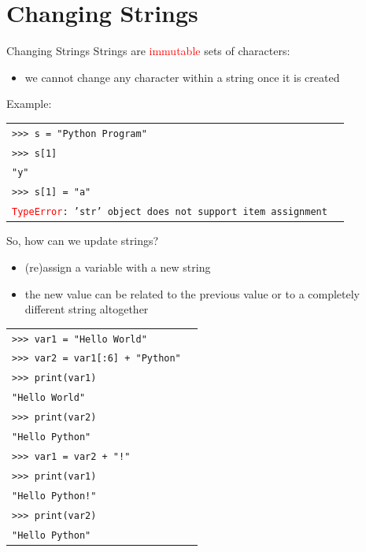 \documentclass[t,handout,9pt]{beamer}
\begin{document}
\section{Changing Strings}
\begin{frame}{Changing Strings}
\vfill
Strings are \textcolor{red}{immutable} sets of characters:
\begin{itemize}
	\item we cannot change any character within a string once it is created
\end{itemize}
\vfill
Example:
\begin{table}[]
\begin{flushleft}
\begin{tabular}{ll}
\texttt{>{}>{}> s = "Python Program"} &  \\
\texttt{>{}>{}> s[1]} &  \\
\texttt{"y"} &  \\
\texttt{>{}>{}> s[1] = "a"} &  \\
\texttt{\textcolor{red}{TypeError}: 'str' object does not support item assignment} &  \\
\end{tabular}
\end{flushleft}
\end{table}
\vfill
\end{frame}
%
\begin{frame}
\vfill
So, how can we update strings?
\begin{itemize}
	\item (re)assign a variable with a new string
	\item the new value can be related to the previous value or to a completely different string altogether
\end{itemize}
\vfill
\begin{table}[]
\begin{flushleft}
\begin{tabular}{ll}
\texttt{>{}>{}> var1 = "Hello World"} &  \\
\texttt{>{}>{}> var2 = var1[:6] + "Python"} &  \\
\texttt{>{}>{}> print(var1)} &  \\
\texttt{"Hello World"} &  \\
\texttt{>{}>{}> print(var2)} &  \\
\texttt{"Hello Python"} &  \\
\texttt{>{}>{}> var1 = var2 + "!"} &  \\
\texttt{>{}>{}> print(var1)} &  \\
\texttt{"Hello Python!"} &  \\
\texttt{>{}>{}> print(var2)} &  \\
\texttt{"Hello Python"} &  \\
\end{tabular}
\end{flushleft}
\end{table}
\vfill
\end{frame}
%
\end{document}
